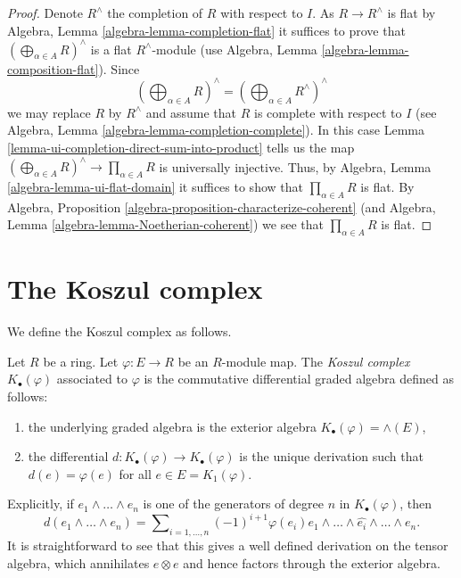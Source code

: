 \begin{proof}
Denote $R^\wedge$ the completion of $R$ with respect to $I$. As
$R \to R^\wedge$ is flat by
Algebra, Lemma \ref{algebra-lemma-completion-flat}
it suffices to prove that
$(\bigoplus\nolimits_{\alpha \in A} R)^\wedge$ is a flat
$R^\wedge$-module (use
Algebra, Lemma \ref{algebra-lemma-composition-flat}).
Since
$$
(\bigoplus\nolimits_{\alpha \in A} R)^\wedge
=
(\bigoplus\nolimits_{\alpha \in A} R^\wedge)^\wedge
$$
we may replace $R$ by $R^\wedge$ and assume that $R$ is complete with
respect to $I$ (see
Algebra, Lemma \ref{algebra-lemma-completion-complete}).
In this case
Lemma \ref{lemma-ui-completion-direct-sum-into-product}
tells us the map
$(\bigoplus\nolimits_{\alpha \in A} R)^\wedge \to \prod_{\alpha \in A} R$
is universally injective. Thus, by
Algebra, Lemma \ref{algebra-lemma-ui-flat-domain}
it suffices to show that $\prod_{\alpha \in A} R$ is flat. By
Algebra, Proposition \ref{algebra-proposition-characterize-coherent}
(and
Algebra, Lemma \ref{algebra-lemma-Noetherian-coherent})
we see that $\prod_{\alpha \in A} R$ is flat.
\end{proof}











\section{The Koszul complex}
\label{section-koszul}

\noindent
We define the Koszul complex as follows.

\begin{definition}
\label{definition-koszul}
Let $R$ be a ring. Let $\varphi : E \to R$ be an $R$-module map. The
{\it Koszul complex} $K_\bullet(\varphi)$ associated to $\varphi$
is the commutative differential graded algebra defined as follows:
\begin{enumerate}
\item the underlying graded algebra is the exterior algebra
$K_\bullet(\varphi) = \wedge(E)$,
\item the differential $d : K_\bullet(\varphi) \to K_\bullet(\varphi)$
is the unique derivation such that $d(e) = \varphi(e)$ for all
$e \in E = K_1(\varphi)$.
\end{enumerate}
\end{definition}

\noindent
Explicitly, if $e_1 \wedge \ldots \wedge e_n$ is one of the generators of
degree $n$ in $K_\bullet(\varphi)$, then
$$
d(e_1 \wedge \ldots \wedge e_n) =
\sum\nolimits_{i = 1, \ldots, n} (-1)^{i + 1}
\varphi(e_i)e_1 \wedge \ldots \wedge \widehat{e_i} \wedge \ldots \wedge e_n.
$$
It is straightforward to see that this gives a well defined derivation
on the tensor algebra, which annihilates $e \otimes e$ and hence factors
through the exterior algebra.

